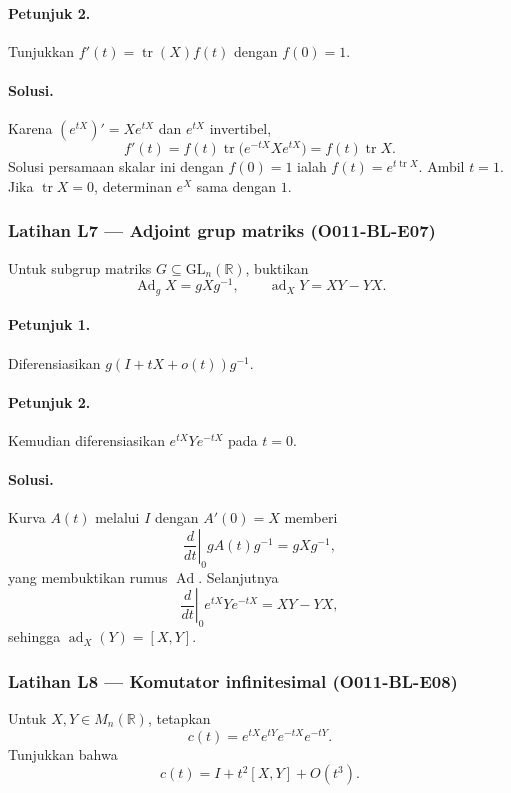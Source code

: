 \paragraph{Petunjuk 2.}
Tunjukkan $f'(t)=\operatorname{tr}(X)f(t)$ dengan $f(0)=1$.

\paragraph{Solusi.}
Karena $(e^{tX})'=Xe^{tX}$ dan $e^{tX}$ invertibel,
\[
 f'(t)=f(t)\operatorname{tr}\bigl(e^{-tX}Xe^{tX}\bigr)
 =f(t)\operatorname{tr}X.
\]
Solusi persamaan skalar ini dengan $f(0)=1$ ialah
$f(t)=e^{t\operatorname{tr}X}$. Ambil $t=1$. Jika
$\operatorname{tr}X=0$, determinan $e^X$ sama dengan $1$.

\subsubsection*{Latihan L7 — Adjoint grup matriks (O011-BL-E07)}
\label{o011-bl-e07}

Untuk subgrup matriks $G\subseteq\mathrm{GL}_n(\mathbb R)$, buktikan
\[
 \operatorname{Ad}_gX=gXg^{-1},
 \qquad
 \operatorname{ad}_XY=XY-YX.
\]

\paragraph{Petunjuk 1.}
Diferensiasikan $g(I+tX+o(t))g^{-1}$.

\paragraph{Petunjuk 2.}
Kemudian diferensiasikan $e^{tX}Ye^{-tX}$ pada $t=0$.

\paragraph{Solusi.}
Kurva $A(t)$ melalui $I$ dengan $A'(0)=X$ memberi
\[
 \left.\frac d{dt}\right|_0gA(t)g^{-1}=gXg^{-1},
\]
yang membuktikan rumus $\operatorname{Ad}$. Selanjutnya
\[
 \left.\frac d{dt}\right|_0 e^{tX}Ye^{-tX}
 =XY-YX,
\]
sehingga $\operatorname{ad}_X(Y)=[X,Y]$.

\subsubsection*{Latihan L8 — Komutator infinitesimal (O011-BL-E08)}
\label{o011-bl-e08}

Untuk $X,Y\in M_n(\mathbb R)$, tetapkan
\[
 c(t)=e^{tX}e^{tY}e^{-tX}e^{-tY}.
\]
Tunjukkan bahwa
\[
 c(t)=I+t^2[X,Y]+O(t^3).
\]

